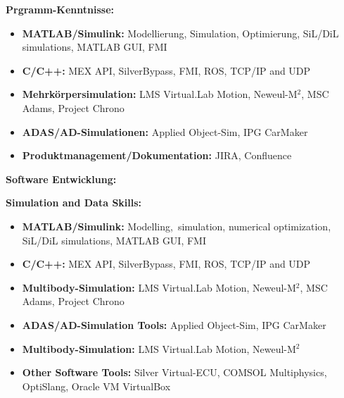 \documentclass{classic}
\begin{document}
\begin{paracol}{2}
    {
        {\bfseries Prgramm-Kenntnisse:}
        \begin{itemize}
            \item {\bfseries MATLAB/Simulink:} Modellierung, Simulation,
                Optimierung, SiL/DiL simulations, MATLAB GUI, FMI
            \item {\bfseries C/C++:} MEX API, SilverBypass, FMI, ROS, TCP/IP and UDP
            \item{\bfseries Mehrk{\"o}rpersimulation:}  LMS Virtual.Lab Motion, Neweul-M$^2$, 
                MSC Adams, Project Chrono
            \item{\bfseries ADAS/AD-Simulationen:} Applied Object-Sim, IPG CarMaker
            \item {\bfseries Produktmanagement/Dokumentation:} JIRA, Confluence
        \end{itemize} \par

        {\bfseries Software Entwicklung:}\par
    }
    {
        {\bfseries Simulation and Data Skills:}
        \begin{itemize}
            \item {\bfseries MATLAB/Simulink:} Modelling, \,simulation,
                numerical optimization, SiL/DiL simulations, MATLAB GUI, FMI
            \item {\bfseries C/C++:} MEX API, SilverBypass, FMI, ROS, TCP/IP and UDP
            \item{\bfseries Multibody-Simulation:}  LMS Virtual.Lab Motion, Neweul-M$^2$, 
                MSC Adams, Project Chrono
            \item{\bfseries ADAS/AD-Simulation Tools:}  Applied Object-Sim, IPG CarMaker
            \item{\bfseries Multibody-Simulation:}  LMS Virtual.Lab Motion, Neweul-M$^2$
            \item {\bfseries Other Software Tools:}  Silver Virtual-ECU, COMSOL
                Multiphysics, OptiSlang, Oracle VM VirtualBox
        \end{itemize} \par

}
\end{paracol}
\end{document}
